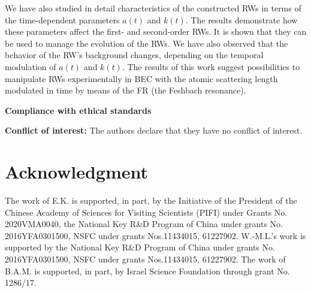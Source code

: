 \documentclass[preprintnumbers]{revtex4}
\begin{document}
We have also studied in detail characteristics of the constructed RWs in
terms of the time-dependent parameters $a(t)$ and $k(t)$. The results
demonstrate how these parameters affect the first- and second-order RWs. It
is shown that they can be used to manage the evolution of the RWs. We have
also observed that the behavior of the RW's background changes, depending on
the temporal modulation of $a(t)$ and $k(t)$. The results of this work
suggest possibilities to manipulate RWs experimentally in BEC with the
atomic scattering length modulated in time by means of the FR (the Feshbach
resonance).\bigskip\

\textbf{Compliance with ethical standards} \bigskip

\textbf{Conflict of interest:} The authors declare that they have no
conflict of interest. \bigskip

\section*{Acknowledgment}

The work of E.K. is supported, in part, by the Initiative of the President
of the Chinese Academy of Sciences for Visiting Scientists (PIFI) under
Grants No. 2020VMA0040, the National Key R\&D Program of China under grants
No. 2016YFA0301500, NSFC under grants Nos.11434015, 61227902. W.-M.L.'s work
is supported by the National Key R\&D Program of China under grants No.
2016YFA0301500, NSFC under grants Nos.11434015, 61227902. The work of B.A.M.
is supported, in part, by Israel Science Foundation through grant No.
1286/17.
\end{document}

